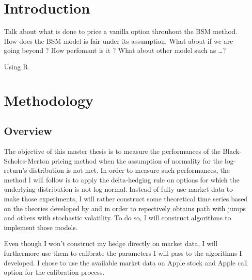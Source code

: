 \documentclass[12pt]{report}
\begin{document}

\tableofcontents{}



%
%
\chapter*{Introduction}
\label{cha:Introduction}

Talk about what is done to price a vanilla option throuhout the BSM method.
How does the BSM model is fair under its assumption. What about if we are going beyond ?
How perfomant is it ? 
What about other model such as \ldots ?

Using R. \cite{R}
%
%
\chapter{Methodology}
\label{cha:Methodology}


\section{Overview}
\label{sec:methodology:overview}

The objective of this master thesis is to measure the performances of the Black-Scholes-Merton pricing method when the assumption of normality for the log-return's distribution is not met.
In order to measure such performances, the method I will follow is to apply the delta-hedging rule on options for which the underlying distribution is not log-normal.
Instead of fully use market data to make those experiments, I will rather construct some theoretical time series based on the theories developed by \citet{merton76} and \citet{heston1993} in order to repectively obtains path with jumps and others with stochastic volatility.
To do so, I will construct algorithms to implement those models. 

Even though I won't construct my hedge directly on market data, I will furthermore use them to calibrate the parameters I will pass to the algorithms I developed.
I chose to use the available market data on Apple stock and Apple call option for the calibration process.
\end{document}
